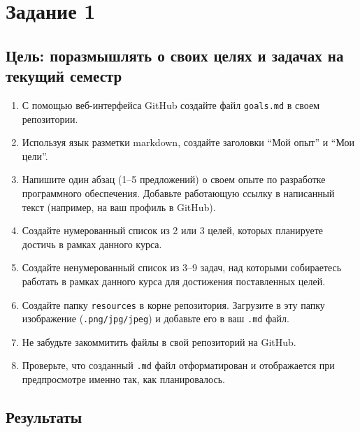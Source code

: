 \documentclass[a4paper, 12pt]{extarticle}
\theoremstyle{definition}
\theoremstyle{plain}
\theoremstyle{remark}
\begin{document}

\addtocounter{page}{1} %

\section{Задание 1}
\subsection*{Цель: поразмышлять о своих целях и задачах на текущий семестр}

\begin{enumerate}[label=\arabic*.]
    \item С помощью веб-интерфейса GitHub создайте файл \texttt{goals.md} в своем репозитории.
    
    \item Используя язык разметки markdown, создайте заголовки ``Мой опыт'' и ``Мои цели''.
    
    \item Напишите один абзац (1--5 предложений) о своем опыте по разработке программного обеспечения. Добавьте работающую ссылку в написанный текст (например, на ваш профиль в GitHub).
    
    \item Создайте нумерованный список из 2 или 3 целей, которых планируете достичь в рамках данного курса.
    
    \item Создайте ненумерованный список из 3--9 задач, над которыми собираетесь работать в рамках данного курса для достижения поставленных целей.
    
    \item Создайте папку \texttt{resources} в корне репозитория. Загрузите в эту папку изображение (\texttt{.png/jpg/jpeg}) и добавьте его в ваш \texttt{.md} файл.
    
    \item Не забудьте закоммитить файлы в свой репозиторий на GitHub.
    
    \item Проверьте, что созданный \texttt{.md} файл отформатирован и отображается при предпросмотре именно так, как планировалось.
\end{enumerate}

\subsection{Результаты}
\end{document}

